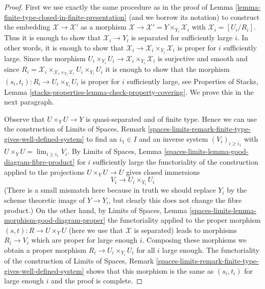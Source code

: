 \begin{proof}
First we use exactly the same procedure as in the proof of
Lemma \ref{lemma-finite-type-closed-in-finite-presentation}
(and we borrow its notation)
to construct the embedding $\mathcal{X} \to \mathcal{X}'$ as a morphism
$\mathcal{X} \to \mathcal{X}' = Y \times_{Y_i} \mathcal{X}_i$ with
$\mathcal{X}_i = [U_i/R_i]$.
Thus it is enough to show that $\mathcal{X}_i \to Y_i$ is
separated for sufficiently large $i$.
In other words, it is enough to show that
$\mathcal{X}_i \to \mathcal{X}_i \times_{Y_i} \mathcal{X}_i$
is proper for $i$ sufficiently large. Since the morphism
$U_i \times_{Y_i} U_i \to \mathcal{X}_i \times_{Y_i} \mathcal{X}_i$
is surjective and smooth and since
$R_i = \mathcal{X}_i
\times_{\mathcal{X}_i \times_{Y_i} \mathcal{X}_i} U_i \times_{Y_i} U_i$
it is enough to show that the morphism
$(s_i, t_i) : R_i \to U_i \times_{Y_i} U_i$
is proper for $i$ sufficiently large, see
Properties of Stacks, Lemma
\ref{stacks-properties-lemma-check-property-covering}.
We prove this in the next paragraph.

\medskip\noindent
Observe that $U \times_Y U \to Y$ is quasi-separated and of finite type.
Hence we can use the construction of 
Limits of Spaces, Remark
\ref{spaces-limits-remark-finite-type-gives-well-defined-system}
to find an $i_1 \in I$ and an inverse system $(V_i)_{i \geq i_1}$
with $U \times_Y U = \lim_{i \geq i_1} V_i$.
By Limits of Spaces, Lemma \ref{spaces-limits-lemma-good-diagram-fibre-product}
for $i$ sufficiently large the functoriality of the construction
applied to the projections $U \times_Y U \to U$
gives closed immersions
$$
V_i \to U_i \times_{Y_i} U_i
$$
(There is a small mismatch here because in truth we should replace
$Y_i$ by the scheme theoretic image of $Y \to Y_i$, but clearly this
does not change the fibre product.)
On the other hand, by Limits of Spaces, Lemma
\ref{spaces-limits-lemma-morphism-good-diagram-proper}
the functoriality applied to the proper morphism
$(s, t) : R \to U \times_Y U$ (here we use that $\mathcal{X}$ is separated)
leads to morphisms $R_i \to V_i$ which are proper for
large enough $i$.
Composing these morphisms we obtain a proper morphism
$R_i \to U_i \times_{Y_i} U_i$ for all $i$ large enough.
The functoriality of the construction of
Limits of Spaces, Remark
\ref{spaces-limits-remark-finite-type-gives-well-defined-system}
shows that this morphism is the same as $(s_i, t_i)$
for large enough $i$ and the proof is complete.
\end{proof}






